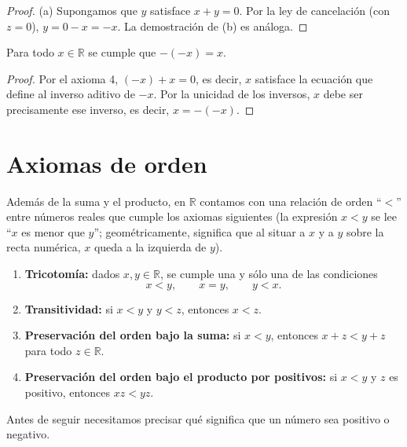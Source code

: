 \documentclass[12pt,a4paper]{book}
\begin{document}
  \begin{proof}
    (a) Supongamos que $y$ satisface $x+y=0$. Por la ley de cancelación (con $z=0$), $y=0-x=-x$. La demostración de (b) es análoga.
  \end{proof}
  
  \begin{corolario}
    Para todo $x \in \mathbb{R}$ se cumple que $-(-x)=x$.
  \end{corolario}
  
  \begin{proof}
    Por el axioma 4, $(-x)+x=0$, es decir, $x$ satisface la ecuación que define al inverso aditivo de $-x$. Por la unicidad de los inversos, $x$ debe ser precisamente ese inverso, es decir, $x=-(-x)$.
  \end{proof}
  
  \section{Axiomas de orden}
  
  Además de la suma y el producto, en $\mathbb{R}$ contamos con una relación de orden ``$<$'' entre números reales que cumple los axiomas siguientes (la expresión $x<y$ se lee ``$x$ es menor que $y$''; geométricamente, significa que al situar a $x$ y a $y$ sobre la recta numérica, $x$ queda a la izquierda de $y$).
  
  \begin{enumerate}[leftmargin=2.6em]
    \item[\textbf{10.}] \textbf{Tricotomía:} dados $x,y \in \mathbb{R}$, se cumple una y sólo una de las condiciones
          \begin{equation*}
            x<y, \qquad x=y, \qquad y<x.
          \end{equation*}
    \item[\textbf{11.}] \textbf{Transitividad:} si $x<y$ y $y<z$, entonces $x<z$.
    \item[\textbf{12.}] \textbf{Preservación del orden bajo la suma:} si $x<y$, entonces $x+z<y+z$ para todo $z \in \mathbb{R}$.
    \item[\textbf{13.}] \textbf{Preservación del orden bajo el producto por positivos:} si $x<y$ y $z$ es positivo, entonces $xz<yz$.
  \end{enumerate}
  
  Antes de seguir necesitamos precisar qué significa que un número sea positivo o negativo.
  
\end{document}
